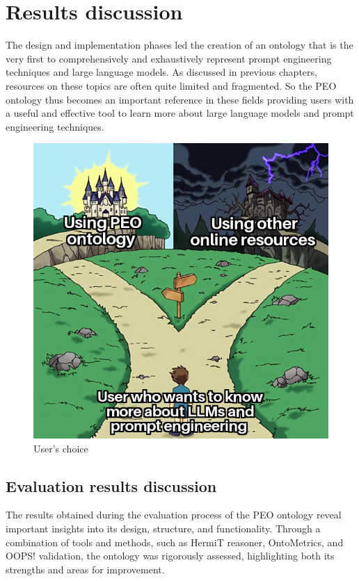\newpage
\section{Results discussion}
The design and implementation phases led the creation of an ontology that is the very first to comprehensively and exhaustively represent prompt engineering techniques and large language models. As discussed in previous chapters, resources on these topics are often quite limited and fragmented. So the PEO ontology thus becomes an important reference in these fields providing users with a useful and effective tool to learn more about large language models and prompt engineering techniques.

\begin{figure}[H]
    \centering
    \includegraphics[width=0.6\linewidth]{Figures/fig_77.jpg}
    \caption{User's choice}
    \label{fig:enter-label}
\end{figure}

\subsection{Evaluation results discussion}
The results obtained during the evaluation process of the PEO ontology reveal important insights into its design, structure, and functionality. Through a combination of tools and methods, such as HermiT reasoner, OntoMetrics, and OOPS! validation, the ontology was rigorously assessed, highlighting both its strengths and areas for improvement.

